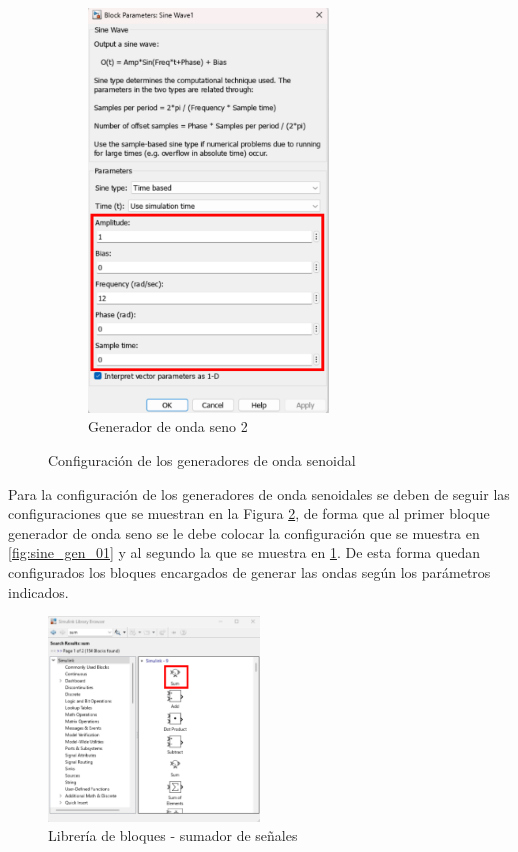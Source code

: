 \begin{figure}[htbp]
\begin{subfigure}[b]{0.45\textwidth}
        \includegraphics[width=0.7\textwidth]{fig/especifico_2/CASO_ESTUDIO_FILTRO/sinewave_2.pdf}
        \caption{Generador de onda seno 2}
        \label{fig:sine_gen_02}
    \end{subfigure}
    \caption{Configuración de los generadores de onda senoidal}
    \label{fig:sine_wave_generators_config}
\end{figure}

Para la configuración de los generadores de onda senoidales se deben de seguir las configuraciones que se muestran en la Figura \ref{fig:sine_wave_generators_config}, de forma que al primer bloque generador de onda seno se le debe colocar la configuración que se muestra en \ref{fig:sine_gen_01} y al segundo la que se muestra en \ref{fig:sine_gen_02}. De esta forma quedan configurados los bloques encargados de generar las ondas según los parámetros indicados.


\begin{figure}[h!]
    \centering
    \includegraphics[width=0.5\textwidth]{fig/especifico_2/CASO_ESTUDIO_FILTRO/sum_0.pdf}
    \caption{Librería de bloques - sumador de señales}
    \label{fig:lib_bloq_sum}
\end{figure}

